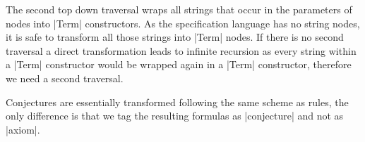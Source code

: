 The second top down traversal wraps all strings that occur in the
parameters of nodes into \code|Term| constructors. As the
specification language has no string nodes, it is safe to transform
all those strings into \code|Term| nodes. If there is no second
traversal a direct transformation leads to infinite recursion as every
string within a \code|Term| constructor would be wrapped again in a
\code|Term| constructor, therefore we need a second traversal.

Conjectures are essentially transformed following the same scheme as
rules, the only difference is that we tag the resulting formulas as
\code|conjecture| and not as \code|axiom|.
